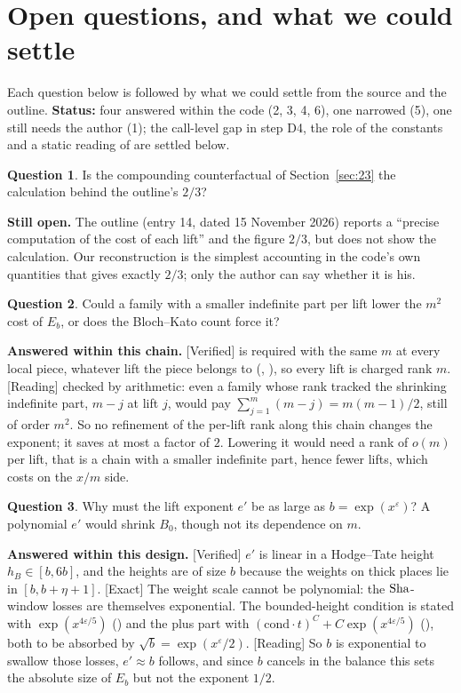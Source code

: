 \documentclass[11pt]{article}
\newcommand{\Exact}{\textcolor{exactc}{\textsf{\small[Exact]}}}
\newcommand{\Verified}{\textcolor{verc}{\textsf{\small[Verified]}}}
\newcommand{\Reading}{\textcolor{readc}{\textsf{\small[Reading]}}}
\newcommand{\eps}{\varepsilon}
\theoremstyle{plain}
\theoremstyle{definition}
\newtheorem{question}{Question}
\begin{document}
\section{Open questions, and what we could settle}\label{sec:open}

Each question below is followed by what we could settle from the source and the outline.
\textbf{Status:} four answered within the code (2, 3, 4, 6), one narrowed (5), one still needs the
author (1); the call-level gap in step D4, the role of the constants and a static reading of
 are settled below.

\begin{question}
Is the compounding counterfactual of Section~\ref{sec:23} the calculation behind the outline's
$2/3$?
\end{question}
\noindent\textbf{Still open.} The outline (entry 14, dated 15 November 2026) reports a ``precise
computation of the cost of each lift'' and the figure $2/3$, but does not show the calculation. Our
reconstruction is the simplest accounting in the code's own quantities that gives exactly $2/3$;
only the author can say whether it is his.

\begin{question}
Could a family with a smaller indefinite part per lift lower the $m^2$ cost of $E_b$, or does the
Bloch--Kato count force it?
\end{question}
\noindent\textbf{Answered within this chain.} \Verified{}  is required with
the same $m$ at every local piece, whatever lift the piece belongs to (,
), so every lift is charged rank $m$. \Reading{} checked by
arithmetic: even a family whose rank tracked the shrinking indefinite part, $m-j$ at lift $j$, would
pay $\sum_{j=1}^{m}(m-j)=m(m-1)/2$, still of order $m^2$. So no refinement of the per-lift rank
along this chain changes the exponent; it saves at most a factor of $2$. Lowering it would need a
rank of $o(m)$ per lift, that is a chain with a smaller indefinite part, hence fewer lifts, which
costs on the $x/m$ side.

\begin{question}
Why must the lift exponent $e'$ be as large as $b=\exp(x^\eps)$? A polynomial $e'$ would shrink
$B_0$, though not its dependence on $m$.
\end{question}
\noindent\textbf{Answered within this design.} \Verified{} $e'$ is linear in a Hodge--Tate height
$h_B\in[b,6b]$, and the heights are of size $b$ because the weights on thick places lie in
$[b,b+\eta+1]$. \Exact{} The weight scale cannot be polynomial: the $\mathrm{Sha}$-window losses are
themselves exponential. The bounded-height condition is stated with $\exp(x^{4\eps/5})$
() and the plus part with $(\mathrm{cond}\cdot t)^C+C\exp(x^{4\eps/5})$ (),
both to be absorbed by $\sqrt b=\exp(x^\eps/2)$. \Reading{} So $b$ is exponential to swallow those
losses, $e'\approx b$ follows, and since $b$ cancels in the balance this sets the absolute size of
$E_b$ but not the exponent $1/2$.
\end{document}
